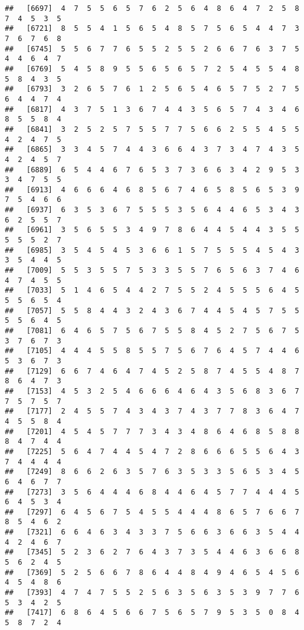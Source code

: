 \documentclass[
]{book}
\begin{document}
\begin{verbatim}
##   [6697]  4  7  5  5  6  5  7  6  2  5  6  4  8  6  4  7  2  5  8  7  4  5  3  5
##   [6721]  8  5  5  4  1  5  6  5  4  8  5  7  5  6  5  4  4  7  3  7  6  7  6  8
##   [6745]  5  5  6  7  7  6  5  5  2  5  5  2  6  6  7  6  3  7  5  4  4  6  4  7
##   [6769]  5  4  5  8  9  5  5  6  5  6  5  7  2  5  4  5  5  4  8  5  8  4  3  5
##   [6793]  3  2  6  5  7  6  1  2  5  6  5  4  6  5  7  5  2  7  5  6  4  4  7  4
##   [6817]  4  3  7  5  1  3  6  7  4  4  3  5  6  5  7  4  3  4  6  8  5  5  8  4
##   [6841]  3  2  5  2  5  7  5  5  7  7  5  6  6  2  5  5  4  5  5  4  2  4  7  5
##   [6865]  3  3  4  5  7  4  4  3  6  6  4  3  7  3  4  7  4  3  5  4  2  4  5  7
##   [6889]  6  5  4  4  6  7  6  5  3  7  3  6  6  3  4  2  9  5  3  3  4  7  5  5
##   [6913]  4  6  6  6  4  6  8  5  6  7  4  6  5  8  5  6  5  3  9  7  5  4  6  6
##   [6937]  6  3  5  3  6  7  5  5  5  3  5  6  4  4  6  5  3  4  3  6  2  5  5  7
##   [6961]  3  5  6  5  5  3  4  9  7  8  6  4  4  5  4  4  3  5  5  5  5  5  2  7
##   [6985]  3  5  4  5  4  5  3  6  6  1  5  7  5  5  5  4  5  4  3  3  5  4  4  5
##   [7009]  5  5  3  5  5  7  5  3  3  5  5  7  6  5  6  3  7  4  6  4  7  4  5  5
##   [7033]  5  1  4  6  5  4  4  2  7  5  5  2  4  5  5  5  6  4  5  5  5  6  5  4
##   [7057]  5  5  8  4  4  3  2  4  3  6  7  4  4  5  4  5  7  5  5  5  5  6  4  5
##   [7081]  6  4  6  5  7  5  6  7  5  5  8  4  5  2  7  5  6  7  5  3  7  6  7  3
##   [7105]  4  4  4  5  5  8  5  5  7  5  6  7  6  4  5  7  4  4  6  5  3  6  7  3
##   [7129]  6  6  7  4  6  4  7  4  5  2  5  8  7  4  5  5  4  8  7  8  6  4  7  3
##   [7153]  4  5  3  2  5  4  6  6  6  4  6  4  3  5  6  8  3  6  7  7  5  7  5  7
##   [7177]  2  4  5  5  7  4  3  4  3  7  4  3  7  7  8  3  6  4  7  4  5  5  8  4
##   [7201]  4  5  4  5  7  7  7  3  4  3  4  8  6  4  6  8  5  8  8  8  4  7  4  4
##   [7225]  5  6  4  7  4  4  5  4  7  2  8  6  6  6  5  5  6  4  3  7  4  4  4  4
##   [7249]  8  6  6  2  6  3  5  7  6  3  5  3  3  5  6  5  3  4  5  6  4  6  7  7
##   [7273]  3  5  6  4  4  4  6  8  4  4  6  4  5  7  7  4  4  4  5  6  4  5  3  4
##   [7297]  6  4  5  6  7  5  4  5  5  4  4  4  8  6  5  7  6  6  7  8  5  4  6  2
##   [7321]  6  6  4  6  3  4  3  3  7  5  6  6  3  6  6  3  5  4  4  4  2  4  6  7
##   [7345]  5  2  3  6  2  7  6  4  3  7  3  5  4  4  6  3  6  6  8  5  6  2  4  5
##   [7369]  5  2  5  6  6  7  8  6  4  4  8  4  9  4  6  5  4  5  6  4  5  4  8  6
##   [7393]  4  7  4  7  5  5  2  5  6  3  5  6  3  5  3  9  7  7  6  5  3  4  2  5
##   [7417]  6  8  6  4  5  6  6  7  5  6  5  7  9  5  3  5  0  8  4  5  8  7  2  4

\end{verbatim}
\end{document}
